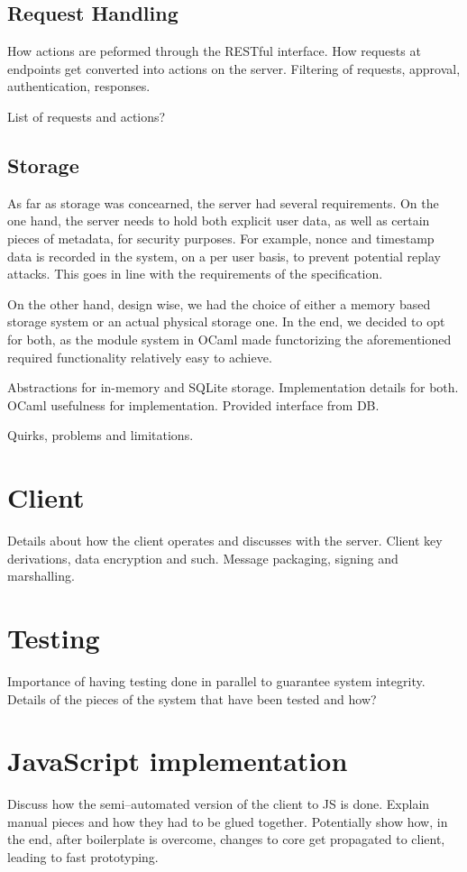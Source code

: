 \subsection{Request Handling}
How actions are peformed through the RESTful interface.
How requests at endpoints get converted into actions on the server.
Filtering of requests, approval, authentication, responses.

List of requests and actions?

\subsection{Storage}
As far as storage was concearned, the server had several requirements.
On the one hand, the server needs to hold both explicit user data, as well as certain pieces of metadata, for security purposes.
For example, nonce and timestamp data is recorded in the system, on a per user basis, to prevent potential replay attacks.
This goes in line with the requirements of the specification.

On the other hand, design wise, we had the choice of either a memory based storage system or an actual physical storage one.
In the end, we decided to opt for both, as the module system in OCaml made functorizing the aforementioned required functionality relatively easy to achieve.


Abstractions for in-memory and SQLite storage.
Implementation details for both.
OCaml usefulness for implementation.
Provided interface from DB.

Quirks, problems and limitations.

\section{Client}
Details about how the client operates and discusses with the server.
Client key derivations, data encryption and such.
Message packaging, signing and marshalling.

\section{Testing}
Importance of having testing done in parallel to guarantee system integrity.
Details of the pieces of the system that have been tested and how?

\section{JavaScript implementation}
Discuss how the semi--automated version of the client to JS is done.
Explain manual pieces and how they had to be glued together.
Potentially show how, in the end, after boilerplate is overcome, changes to core get propagated to client, leading to fast prototyping.
